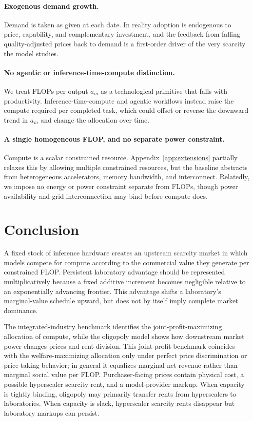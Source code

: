 \documentclass[11pt]{article}
\begin{document}
\paragraph{Exogenous demand growth.} Demand is taken as given at each date. In reality adoption is endogenous to price, capability, and complementary investment, and the feedback from falling quality-adjusted prices back to demand is a first-order driver of the very scarcity the model studies.

\paragraph{No agentic or inference-time-compute distinction.} We treat FLOPs per output $a_m$ as a technological primitive that falls with productivity. Inference-time-compute and agentic workflows instead raise the compute required per completed task, which could offset or reverse the downward trend in $a_m$ and change the allocation over time.

\paragraph{A single homogeneous FLOP, and no separate power constraint.} Compute is a scalar constrained resource. Appendix~\ref{app:extensions} partially relaxes this by allowing multiple constrained resources, but the baseline abstracts from heterogeneous accelerators, memory bandwidth, and interconnect. Relatedly, we impose no energy or power constraint separate from FLOPs, though power availability and grid interconnection may bind before compute does.

\section{Conclusion}
\label{sec:conclusion}

A fixed stock of inference hardware creates an upstream scarcity market in which models compete for compute according to the commercial value they generate per constrained FLOP. Persistent laboratory advantage should be represented multiplicatively because a fixed additive increment becomes negligible relative to an exponentially advancing frontier. This advantage shifts a laboratory's marginal-value schedule upward, but does not by itself imply complete market dominance.

The integrated-industry benchmark identifies the joint-profit-maximizing allocation of compute, while the oligopoly model shows how downstream market power changes prices and rent division. This joint-profit benchmark coincides with the welfare-maximizing allocation only under perfect price discrimination or price-taking behavior; in general it equalizes marginal net revenue rather than marginal social value per FLOP. Purchaser-facing prices contain physical cost, a possible hyperscaler scarcity rent, and a model-provider markup. When capacity is tightly binding, oligopoly may primarily transfer rents from hyperscalers to laboratories. When capacity is slack, hyperscaler scarcity rents disappear but laboratory markups can persist.
\end{document}
